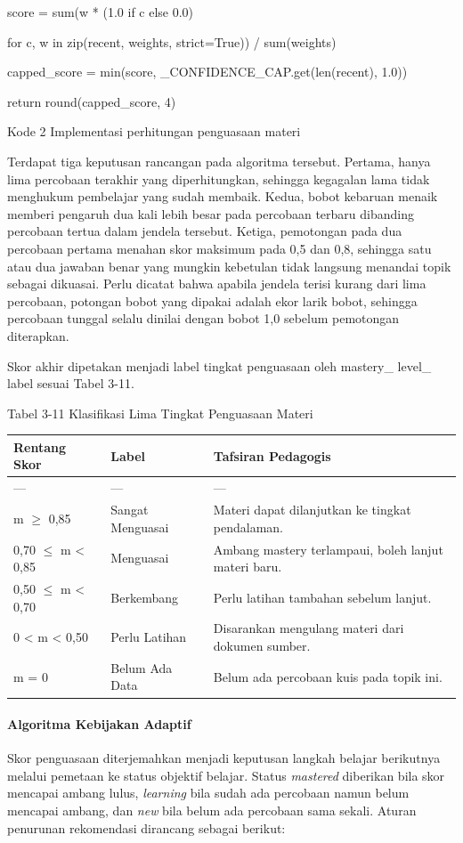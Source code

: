 \documentclass[12pt,a4paper]{article}
\begin{document}
score = sum(w * (1.0 if c else 0.0)

for c, w in zip(recent, weights, strict=True)) / sum(weights)

capped\_score = min(score, \_CONFIDENCE\_CAP.get(len(recent), 1.0))

return round(capped\_score, 4)

Kode 2	Implementasi perhitungan penguasaan materi

Terdapat tiga keputusan rancangan pada algoritma tersebut. Pertama, hanya lima percobaan terakhir yang diperhitungkan, sehingga kegagalan lama tidak menghukum pembelajar yang sudah membaik. Kedua, bobot kebaruan menaik memberi pengaruh dua kali lebih besar pada percobaan terbaru dibanding percobaan tertua dalam jendela tersebut. Ketiga, pemotongan pada dua percobaan pertama menahan skor maksimum pada 0,5 dan 0,8, sehingga satu atau dua jawaban benar yang mungkin kebetulan tidak langsung menandai topik sebagai dikuasai. Perlu dicatat bahwa apabila jendela terisi kurang dari lima percobaan, potongan bobot yang dipakai adalah ekor larik bobot, sehingga percobaan tunggal selalu dinilai dengan bobot 1,0 sebelum pemotongan diterapkan.

Skor akhir dipetakan menjadi label tingkat penguasaan oleh mastery\_ level\_ label sesuai Tabel 3-11.

Tabel 3-11	Klasifikasi Lima Tingkat Penguasaan Materi

\begin{table}[h]
\centering
\begin{tabular}{lll}
\toprule
Rentang Skor & Label & Tafsiran Pedagogis \\
\midrule
--- & --- & --- \\
m $\ge$ 0,85 & Sangat Menguasai & Materi dapat dilanjutkan ke tingkat pendalaman. \\
0,70 $\le$ m \textless{} 0,85 & Menguasai & Ambang mastery terlampaui, boleh lanjut materi baru. \\
0,50 $\le$ m \textless{} 0,70 & Berkembang & Perlu latihan tambahan sebelum lanjut. \\
0 \textless{} m \textless{} 0,50 & Perlu Latihan & Disarankan mengulang materi dari dokumen sumber. \\
m = 0 & Belum Ada Data & Belum ada percobaan kuis pada topik ini. \\
\bottomrule
\end{tabular}
\end{table}
\paragraph*{Algoritma Kebijakan Adaptif}
Skor penguasaan diterjemahkan menjadi keputusan langkah belajar berikutnya melalui pemetaan ke status objektif belajar. Status \textit{mastered} diberikan bila skor mencapai ambang lulus, \textit{learning} bila sudah ada percobaan namun belum mencapai ambang, dan \textit{new} bila belum ada percobaan sama sekali. Aturan penurunan rekomendasi dirancang sebagai berikut:
\end{document}
